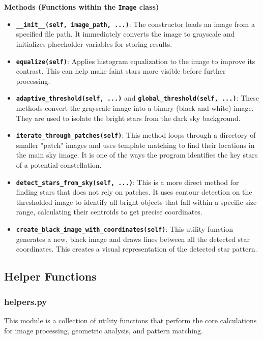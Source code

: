 \documentclass[a4paper,11pt]{article}
\begin{document}
	\textbf{Methods (Functions within the \texttt{Image} class)}
	\begin{itemize}
		\item \textbf{\texttt{\_\_init\_\_(self, image\_path, ...)}}: The constructor loads an image from a specified file path. It immediately converts the image to grayscale and initializes placeholder variables for storing results.
		\item \textbf{\texttt{equalize(self)}}: Applies histogram equalization to the image to improve its contrast. This can help make faint stars more visible before further processing.
		\item \textbf{\texttt{adaptive\_threshold(self, ...)}} and \textbf{\texttt{global\_threshold(self, ...)}}: These methods convert the grayscale image into a binary (black and white) image. They are used to isolate the bright stars from the dark sky background.
		\item \textbf{\texttt{iterate\_through\_patches(self)}}: This method loops through a directory of smaller "patch" images and uses template matching to find their locations in the main sky image. It is one of the ways the program identifies the key stars of a potential constellation.
		\item \textbf{\texttt{detect\_stars\_from\_sky(self, ...)}}: This is a more direct method for finding stars that does not rely on patches. It uses contour detection on the thresholded image to identify all bright objects that fall within a specific size range, calculating their centroids to get precise coordinates.
		\item \textbf{\texttt{create\_black\_image\_with\_coordinates(self)}}: This utility function generates a new, black image and draws lines between all the detected star coordinates. This creates a visual representation of the detected star pattern.
	\end{itemize}
	
	\subsection{Helper Functions}
	\subsubsection*{helpers.py}
	\hrulefill
	
	This module is a collection of utility functions that perform the core calculations for image processing, geometric analysis, and pattern matching.
	
\end{document}
